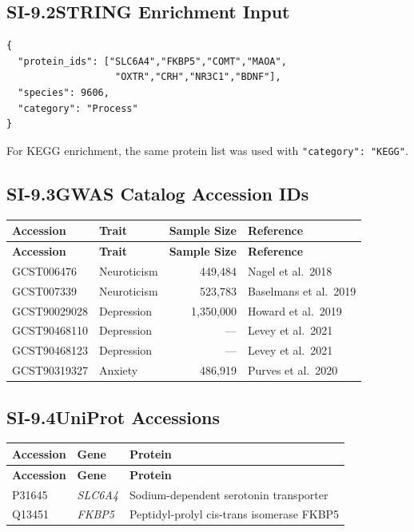 \subsection*{SI-9.2\quad STRING Enrichment Input}

\begin{verbatim}
{
  "protein_ids": ["SLC6A4","FKBP5","COMT","MAOA",
                   "OXTR","CRH","NR3C1","BDNF"],
  "species": 9606,
  "category": "Process"
}
\end{verbatim}

\noindent
For KEGG enrichment, the same protein list was used with
\texttt{"category": "KEGG"}.

\subsection*{SI-9.3\quad GWAS Catalog Accession IDs}

{\small
\begin{longtable}{@{}l l r l@{}}
\toprule
\textbf{Accession} & \textbf{Trait} & \textbf{Sample Size} & \textbf{Reference} \\
\midrule
\endfirsthead
\toprule
\textbf{Accession} & \textbf{Trait} & \textbf{Sample Size} & \textbf{Reference} \\
\midrule
\endhead
\bottomrule
\endlastfoot
GCST006476  & Neuroticism & 449,484  & Nagel et al.\ 2018 \\
\midrule
GCST007339  & Neuroticism & 523,783  & Baselmans et al.\ 2019 \\
\midrule
GCST90029028 & Depression & 1,350,000 & Howard et al.\ 2019 \\
\midrule
GCST90468110 & Depression & --- & Levey et al.\ 2021 \\
\midrule
GCST90468123 & Depression & --- & Levey et al.\ 2021 \\
\midrule
GCST90319327 & Anxiety    & 486,919  & Purves et al.\ 2020 \\
\end{longtable}
}

\subsection*{SI-9.4\quad UniProt Accessions}

{\small
\begin{longtable}{@{}l l l@{}}
\toprule
\textbf{Accession} & \textbf{Gene} & \textbf{Protein} \\
\midrule
\endfirsthead
\toprule
\textbf{Accession} & \textbf{Gene} & \textbf{Protein} \\
\midrule
\endhead
\bottomrule
\endlastfoot
P31645 & \textit{SLC6A4} & Sodium-dependent serotonin transporter \\
\midrule
Q13451 & \textit{FKBP5}  & Peptidyl-prolyl cis-trans isomerase FKBP5 \\
\end{longtable}
}

